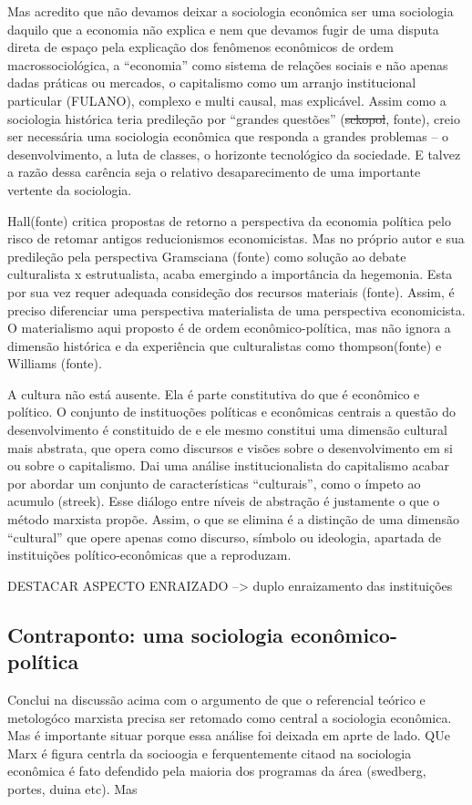 Mas acredito que não devamos deixar a sociologia econômica ser uma sociologia daquilo que a economia não explica e nem que devamos fugir de uma disputa direta de espaço pela explicação dos fenômenos econômicos de ordem macrossociológica, a ``economia'' como sistema de relações sociais e não apenas dadas práticas ou mercados, o capitalismo como um arranjo institucional particular (FULANO), complexo e multi causal, mas explicável. Assim como a sociologia histórica teria predileção por ``grandes questões'' (\sout{sckopol}, fonte), creio ser necessária uma sociologia econômica que responda a grandes problemas -- o desenvolvimento, a luta de classes, o horizonte tecnológico da sociedade. E talvez a razão dessa carência  seja o relativo desaparecimento de uma importante vertente da sociologia.

Hall(fonte) critica propostas de retorno a perspectiva da economia política pelo risco de retomar antigos reducionismos economicistas. Mas no próprio autor e sua predileção pela perspectiva Gramsciana (fonte) como solução ao debate culturalista x estrutualista, acaba emergindo a importância da hegemonia. Esta por sua vez requer adequada consideção dos recursos materiais (fonte). Assim, é preciso diferenciar uma perspectiva materialista de uma perspectiva economicista. O materialismo aqui proposto é de ordem econômico-política, mas não ignora a dimensão histórica e da experiência que culturalistas como thompson(fonte) e Williams (fonte).

A cultura não está ausente. Ela é parte constitutiva do que é econômico e político. O conjunto de instituoções políticas e econômicas centrais a questão do desenvolvimento é constituido de e ele mesmo constitui uma dimensão cultural mais abstrata, que opera como discursos e visões sobre o desenvolvimento em si ou sobre o capitalismo. Dai uma análise institucionalista do capitalismo acabar por abordar um conjunto de características ``culturais'', como o ímpeto ao acumulo (streek). Esse diálogo entre níveis de abstração é justamente o que o método marxista propõe. Assim, o que se elimina é a distinção de uma dimensão ``cultural'' que opere apenas como discurso, símbolo ou ideologia, apartada de instituições político-econômicas que a reproduzam.

DESTACAR ASPECTO ENRAIZADO --> duplo enraizamento das instituições


\subsection{Contraponto: uma sociologia econômico-política}
Conclui na discussão acima com o argumento de que o referencial teórico e metologóco marxista precisa ser retomado como central a sociologia econômica. Mas é importante situar porque essa análise foi deixada em aprte de lado. QUe Marx é figura centrla da socioogia e ferquentemente citaod na sociologia econômica é fato defendido pela maioria dos programas da área (swedberg, portes, duina etc). Mas 

